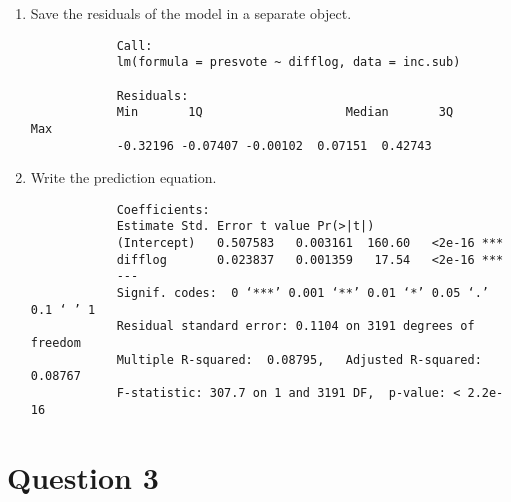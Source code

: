 \documentclass[12pt,letterpaper]{article}
\begin{document}
\begin{enumerate}
		\item Save the residuals of the model in a separate object.	\vspace{0.05cm}
			\vspace{0.05cm}
		
		\begin{verbatim}
			Call:
			lm(formula = presvote ~ difflog, data = inc.sub)
			
			Residuals:
			Min       1Q   					Median       3Q      Max  
			-0.32196 -0.07407 -0.00102  0.07151  0.42743 
		\end{verbatim}
		
		\item Write the prediction equation.
			\vspace{0.05cm}	
		\begin{verbatim}
			Coefficients:
			Estimate Std. Error t value Pr(>|t|)    
			(Intercept)   0.507583   0.003161  160.60   <2e-16 ***
			difflog       0.023837   0.001359   17.54   <2e-16 ***
			---
			Signif. codes:  0 ‘***’ 0.001 ‘**’ 0.01 ‘*’ 0.05 ‘.’ 0.1 ‘ ’ 1
			Residual standard error: 0.1104 on 3191 degrees of freedom
			Multiple R-squared:  0.08795,	Adjusted R-squared:  0.08767 
			F-statistic: 307.7 on 1 and 3191 DF,  p-value: < 2.2e-16
		\end{verbatim}
		
	\end{enumerate}
	
\section*{Question 3}
\end{document}
